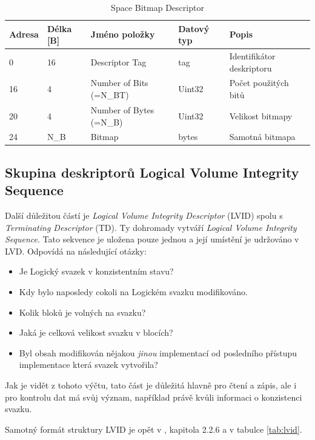 \begin{table}[]
    \centering
    \begin{tabular}{ | l | l | p{4.2cm} | p{1.8cm} | p{5.5cm} | }
        \hline
        Adresa  & Délka [B]   & Jméno položky & Datový typ    & Popis \\ \hline\hline
        0   &16     & Descriptor Tag                    & tag           & Identifikátor deskriptoru \\ \hline
        16  &4      & Number of Bits (=N\_BT)           & Uint32        & Počet použitých bitů \\ \hline
        20  &4      & Number of Bytes (=N\_B)           & Uint32        & Velikost bitmapy \\ \hline
        24  &N\_B   & Bitmap                            & bytes         & Samotná bitmapa \\ \hline
    \end{tabular}
    \caption{Space Bitmap Descriptor\label{tab:sbd}}
\end{table}

\subsection{Skupina deskriptorů Logical Volume Integrity Sequence}
\label{subsec:lvid}
Další důležitou částí je \textit{Logical Volume Integrity Descriptor} (LVID) spolu s \textit{Terminating Descriptor} (TD). Ty dohromady vytváří \textit{Logical Volume Integrity Sequence}. Tato sekvence je uložena pouze jednou a její umístění je udržováno v LVD. Odpovídá na následující otázky:
\begin{itemize}
    \item Je Logický svazek v konzistentním stavu?
    \item Kdy bylo naposledy cokoli na Logickém svazku modifikováno.
    \item Kolik bloků je volných na svazku?
    \item Jaká je celková velikost svazku v blocích?
    \item Byl obsah modifikován nějakou \textit{jinou} implementací od posledního přístupu implementace která svazek vytvořila?
\end{itemize}
Jak je vidět z tohoto výčtu, tato část je důležitá hlavně pro čtení a zápis, ale i pro kontrolu dat má svůj význam, například právě kvůli informaci o konzistenci svazku.
 
Samotný formát struktury LVID je opět v \cite{osta-udf-0201}, kapitola 2.2.6 a v tabulce \ref{tab:lvid}.


